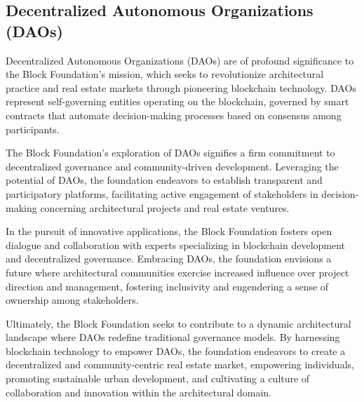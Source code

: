 \subsection{Decentralized Autonomous Organizations (DAOs)}


Decentralized Autonomous Organizations (DAOs) are of profound significance to the Block Foundation's mission, which seeks to revolutionize architectural practice and real estate markets through pioneering blockchain technology. DAOs represent self-governing entities operating on the blockchain, governed by smart contracts that automate decision-making processes based on consensus among participants.

The Block Foundation's exploration of DAOs signifies a firm commitment to decentralized governance and community-driven development. Leveraging the potential of DAOs, the foundation endeavors to establish transparent and participatory platforms, facilitating active engagement of stakeholders in decision-making concerning architectural projects and real estate ventures.

In the pursuit of innovative applications, the Block Foundation fosters open dialogue and collaboration with experts specializing in blockchain development and decentralized governance. Embracing DAOs, the foundation envisions a future where architectural communities exercise increased influence over project direction and management, fostering inclusivity and engendering a sense of ownership among stakeholders.

Ultimately, the Block Foundation seeks to contribute to a dynamic architectural landscape where DAOs redefine traditional governance models. By harnessing blockchain technology to empower DAOs, the foundation endeavors to create a decentralized and community-centric real estate market, empowering individuals, promoting sustainable urban development, and cultivating a culture of collaboration and innovation within the architectural domain.
